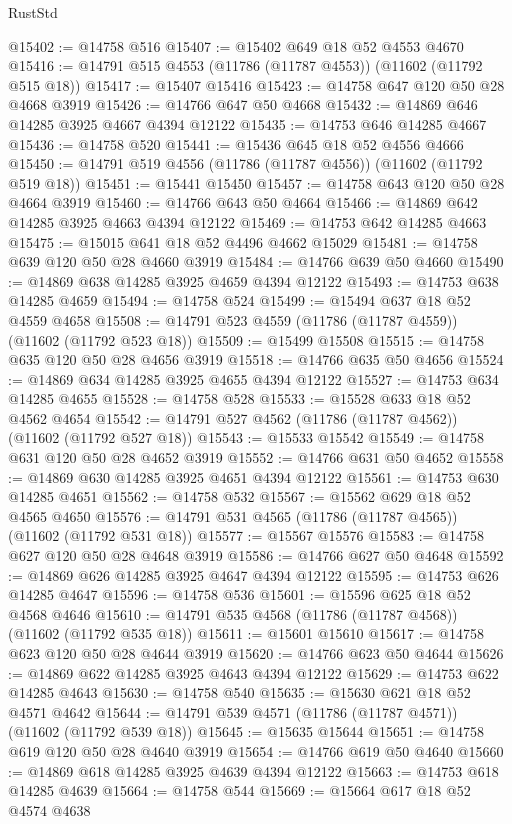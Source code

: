 \begin{lexlean}{RustStd}
\begin{coremodule}
@15402 := @14758 @516
@15407 := @15402 @649 @18 @52 @4553 @4670
@15416 := @14791 @515 @4553 (@11786 (@11787 @4553)) (@11602 (@11792 @515 @18))
@15417 := @15407 @15416
@15423 := @14758 @647 @120 @50 @28 @4668 @3919
@15426 := @14766 @647 @50 @4668
@15432 := @14869 @646 @14285 @3925 @4667 @4394 @12122
@15435 := @14753 @646 @14285 @4667
@15436 := @14758 @520
@15441 := @15436 @645 @18 @52 @4556 @4666
@15450 := @14791 @519 @4556 (@11786 (@11787 @4556)) (@11602 (@11792 @519 @18))
@15451 := @15441 @15450
@15457 := @14758 @643 @120 @50 @28 @4664 @3919
@15460 := @14766 @643 @50 @4664
@15466 := @14869 @642 @14285 @3925 @4663 @4394 @12122
@15469 := @14753 @642 @14285 @4663
@15475 := @15015 @641 @18 @52 @4496 @4662 @15029
@15481 := @14758 @639 @120 @50 @28 @4660 @3919
@15484 := @14766 @639 @50 @4660
@15490 := @14869 @638 @14285 @3925 @4659 @4394 @12122
@15493 := @14753 @638 @14285 @4659
@15494 := @14758 @524
@15499 := @15494 @637 @18 @52 @4559 @4658
@15508 := @14791 @523 @4559 (@11786 (@11787 @4559)) (@11602 (@11792 @523 @18))
@15509 := @15499 @15508
@15515 := @14758 @635 @120 @50 @28 @4656 @3919
@15518 := @14766 @635 @50 @4656
@15524 := @14869 @634 @14285 @3925 @4655 @4394 @12122
@15527 := @14753 @634 @14285 @4655
@15528 := @14758 @528
@15533 := @15528 @633 @18 @52 @4562 @4654
@15542 := @14791 @527 @4562 (@11786 (@11787 @4562)) (@11602 (@11792 @527 @18))
@15543 := @15533 @15542
@15549 := @14758 @631 @120 @50 @28 @4652 @3919
@15552 := @14766 @631 @50 @4652
@15558 := @14869 @630 @14285 @3925 @4651 @4394 @12122
@15561 := @14753 @630 @14285 @4651
@15562 := @14758 @532
@15567 := @15562 @629 @18 @52 @4565 @4650
@15576 := @14791 @531 @4565 (@11786 (@11787 @4565)) (@11602 (@11792 @531 @18))
@15577 := @15567 @15576
@15583 := @14758 @627 @120 @50 @28 @4648 @3919
@15586 := @14766 @627 @50 @4648
@15592 := @14869 @626 @14285 @3925 @4647 @4394 @12122
@15595 := @14753 @626 @14285 @4647
@15596 := @14758 @536
@15601 := @15596 @625 @18 @52 @4568 @4646
@15610 := @14791 @535 @4568 (@11786 (@11787 @4568)) (@11602 (@11792 @535 @18))
@15611 := @15601 @15610
@15617 := @14758 @623 @120 @50 @28 @4644 @3919
@15620 := @14766 @623 @50 @4644
@15626 := @14869 @622 @14285 @3925 @4643 @4394 @12122
@15629 := @14753 @622 @14285 @4643
@15630 := @14758 @540
@15635 := @15630 @621 @18 @52 @4571 @4642
@15644 := @14791 @539 @4571 (@11786 (@11787 @4571)) (@11602 (@11792 @539 @18))
@15645 := @15635 @15644
@15651 := @14758 @619 @120 @50 @28 @4640 @3919
@15654 := @14766 @619 @50 @4640
@15660 := @14869 @618 @14285 @3925 @4639 @4394 @12122
@15663 := @14753 @618 @14285 @4639
@15664 := @14758 @544
@15669 := @15664 @617 @18 @52 @4574 @4638

\end{coremodule}
\end{lexlean}
